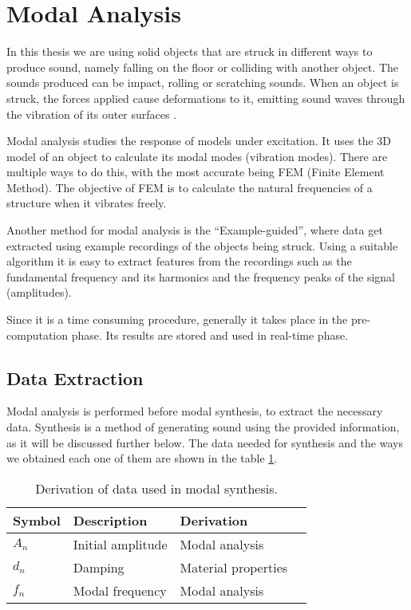 \section{Modal Analysis}\label{sec:modal_analysis}
In this thesis we are using solid objects that are struck in different ways to produce sound, namely falling on the floor or colliding with another object. The sounds produced can be impact, rolling or scratching sounds. When an object is struck, the forces applied cause deformations to it, emitting sound waves through the vibration of its outer surfaces \cite{van2001foleyautomatic}.

Modal analysis studies the response of models under excitation. It uses the 3D model of an object to calculate its modal modes (vibration modes). There are multiple ways to do this, with the most accurate being \gls{FEM} (Finite Element Method). The objective of \gls{FEM} is to calculate the natural frequencies of a structure when it vibrates freely.

Another method for modal analysis is the ``Example-guided'', where data get extracted using example recordings of the objects being struck. Using a suitable algorithm it is easy to extract features from the recordings such as the fundamental frequency and its harmonics and the frequency peaks of the signal (amplitudes).

Since it is a time consuming procedure, generally it takes place in the pre-computation phase. Its results are stored and used in real-time phase.

\subsection{Data Extraction}\label{sec:data_extract}
Modal analysis is performed before modal synthesis, to extract the necessary data. Synthesis is a method of generating sound using the provided information, as it will be discussed further below. The data needed for synthesis and the ways we obtained each one of them are shown in the table \ref{tab:extracted_data}.

\begin{table}[H]
	\centering
    \begin{tabular}{ | l | l | l | p{5cm} |}
    \hline
    \textbf{Symbol} & \textbf{Description} & \textbf{Derivation} \\ \hline
    $A_n$ & Initial amplitude & Modal analysis \\ \hline
    $d_n$ & Damping & Material properties \\ \hline
    $f_n$ & Modal frequency & Modal analysis \\
    \hline
    \end{tabular}
    \caption{Derivation of data used in modal synthesis.}
    \label{tab:extracted_data}
\end{table} 

